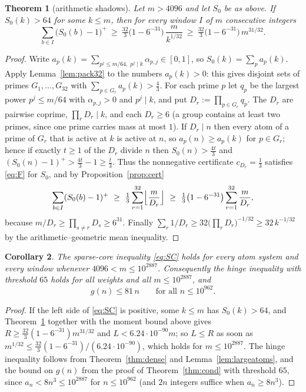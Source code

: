\documentclass[11pt]{article}
\newtheorem{theorem}{Theorem}[section]
\newtheorem{corollary}[theorem]{Corollary}
\theoremstyle{definition}
\begin{document}
\begin{theorem}[arithmetic shadows]\label{thm:shadow}
Let $m>4096$ and let $S_0$ be as above. If $S_0(k)>64$ for some $k\le m$, then for every window $I$ of $m$ consecutive integers
\[
\sum_{b\in I}\bigl(S_0(b)-1\bigr)^+\ \ge\ \tfrac{32}{3}\bigl(1-6^{-31}\bigr)\,\frac{m}{k^{1/32}}\ \ge\ \tfrac{32}{3}\bigl(1-6^{-31}\bigr)\,m^{31/32}.
\]
\end{theorem}
\begin{proof}
Write $a_p(k)=\sum_{p^j\le m/64,\;p^j\mid k}\alpha_{p,j}\in[0,1]$, so $S_0(k)=\sum_pa_p(k)$. Apply Lemma~\ref{lem:pack32} to the
numbers $a_p(k)>0$: this gives disjoint sets of primes $G_1,\dots,G_{32}$ with $\sum_{p\in G_r}a_p(k)>\tfrac43$. For each prime $p$
let $q_p$ be the largest power $p^j\le m/64$ with $\alpha_{p,j}>0$ and $p^j\mid k$, and put $D_r:=\prod_{p\in G_r}q_p$. The $D_r$ are
pairwise coprime, $\prod_rD_r\mid k$, and each $D_r\ge6$ (a group contains at least two primes, since one prime carries mass at most $1$).
If $D_r\mid n$ then every atom of a prime of $G_r$ that is active at $k$ is active at $n$, so $a_p(n)\ge a_p(k)$ for $p\in G_r$; hence if
exactly $t\ge1$ of the $D_r$ divide $n$ then $S_0(n)>\tfrac{4t}3$ and $(S_0(n)-1)^+>\tfrac{4t}3-1\ge\tfrac t3$. Thus the nonnegative
certificate $c_{D_r}=\tfrac13$ satisfies \eqref{eq:F} for $S_0$, and by Proposition~\ref{prop:cert}
\[
\sum_{b\in I}(S_0(b)-1)^+\ \ge\ \tfrac13\sum_{r=1}^{32}\Bigl\lfloor\frac m{D_r}\Bigr\rfloor\ \ge\ \tfrac13\bigl(1-6^{-31}\bigr)\sum_{r=1}^{32}\frac m{D_r},
\]
because $m/D_r\ge\prod_{s\ne r}D_s\ge6^{31}$. Finally $\sum_r1/D_r\ge32\bigl(\prod_rD_r\bigr)^{-1/32}\ge32\,k^{-1/32}$ by the
arithmetic--geometric mean inequality.
\end{proof}

\begin{corollary}\label{cor:2887}
The sparse-core inequality \eqref{eq:SC} holds for every atom system and every window whenever $4096<m\le10^{2887}$. Consequently
the hinge inequality with threshold $65$ holds for all weights and all $m\le10^{2887}$, and
\[
g(n)\le81\,n\qquad\text{for all }n\le10^{962}.
\]
\end{corollary}
\begin{proof}
If the left side of \eqref{eq:SC} is positive, some $k\le m$ has $S_0(k)>64$, and Theorem~\ref{thm:shadow} together with the
moment bound above gives $R\ge\tfrac{32}3(1-6^{-31})m^{31/32}$ and $L<6.24\cdot10^{-90}m$; so $L\le R$ as soon as
$m^{1/32}\le\tfrac{32}{3}(1-6^{-31})/(6.24\cdot10^{-90})$, which holds for $m\le10^{2887}$. The hinge inequality follows from
Theorem~\ref{thm:dense} and Lemma~\ref{lem:largeatoms}, and the bound on $g(n)$ from the proof of Theorem~\ref{thm:cond} with
threshold $65$, since $a_n<8n^3\le10^{2887}$ for $n\le10^{962}$ (and $2n$ integers suffice when $a_n\ge8n^3$).
\end{proof}
\end{document}
